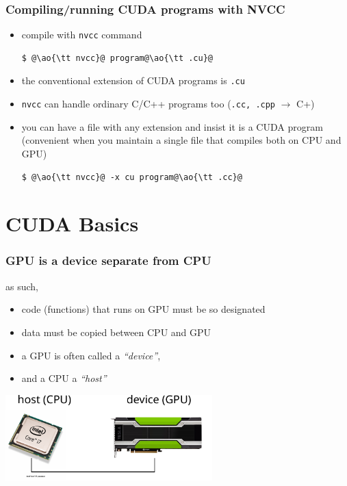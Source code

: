 \documentclass[12pt,dvipdfmx]{beamer}
\newcommand{\ao}[1]{{\color{blue}#1}}
\begin{document}
\begin{frame}[fragile]
\frametitle{Compiling/running CUDA programs with NVCC}

\begin{itemize}
\item compile with {\tt nvcc} command
\begin{lstlisting}
$ @\ao{\tt nvcc}@ program@\ao{\tt .cu}@
\end{lstlisting}
\item the conventional extension of CUDA programs is {\tt .cu}
  
\item {\tt nvcc} can handle ordinary C/C++ programs too
  ({\tt .cc, .cpp} $\rightarrow$ C+)

\item  you can have a file with any extension and insist it is a CUDA program
  (convenient when you maintain
  a single file that compiles both on CPU and GPU)
\begin{lstlisting}
$ @\ao{\tt nvcc}@ -x cu program@\ao{\tt .cc}@
\end{lstlisting}
  

\end{itemize}
\end{frame}

\section{CUDA Basics}

\begin{frame}
  \frametitle{GPU is a device separate from CPU}
  as such,
  \begin{itemize}
  \item code (functions) that runs on GPU must be so designated
  \item data must be copied between CPU and GPU
  \item a GPU is often called a \ao{\it ``device''},
  \item and a CPU a \ao{\it ``host''}
  \end{itemize}

  \begin{center}
\includegraphics[width=0.6\textwidth]{out/pdf/svg/cpu_gpu_1.pdf}
  \end{center}
  
\end{frame}
\end{document}
